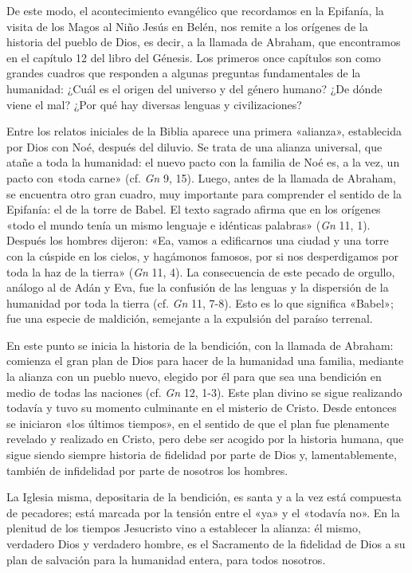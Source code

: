 \documentclass[]{article}
\begin{document}
De este modo, el acontecimiento evangélico que recordamos en la
Epifanía, la visita de los Magos al Niño Jesús en Belén, nos remite a
los orígenes de la historia del pueblo de Dios, es decir, a la llamada
de Abraham, que encontramos en el capítulo 12 del libro del Génesis. Los
primeros once capítulos son como grandes cuadros que responden a algunas
preguntas fundamentales de la humanidad: ¿Cuál es el origen del universo
y del género humano? ¿De dónde viene el mal? ¿Por qué hay diversas
lenguas y civilizaciones?

Entre los relatos iniciales de la Biblia aparece una primera «alianza»,
establecida por Dios con Noé, después del diluvio. Se trata de una
alianza universal, que atañe a toda la humanidad: el nuevo pacto con la
familia de Noé es, a la vez, un pacto con «toda carne» (cf. \emph{Gn} 9,
15). Luego, antes de la llamada de Abraham, se encuentra otro gran
cuadro, muy importante para comprender el sentido de la Epifanía: el de
la torre de Babel. El texto sagrado afirma que en los orígenes «todo el
mundo tenía un mismo lenguaje e idénticas palabras» (\emph{Gn} 11, 1).
Después los hombres dijeron: «Ea, vamos a edificarnos una ciudad y una
torre con la cúspide en los cielos, y hagámonos famosos, por si nos
desperdigamos por toda la haz de la tierra» (\emph{Gn} 11, 4). La
consecuencia de este pecado de orgullo, análogo al de Adán y Eva, fue la
confusión de las lenguas y la dispersión de la humanidad por toda la
tierra (cf. \emph{Gn} 11, 7-8). Esto es lo que significa «Babel»; fue
una especie de maldición, semejante a la expulsión del paraíso terrenal.

En este punto se inicia la historia de la bendición, con la llamada de
Abraham: comienza el gran plan de Dios para hacer de la humanidad una
familia, mediante la alianza con un pueblo nuevo, elegido por él para
que sea una bendición en medio de todas las naciones (cf. \emph{Gn} 12,
1-3). Este plan divino se sigue realizando todavía y tuvo su momento
culminante en el misterio de Cristo. Desde entonces se iniciaron «los
últimos tiempos», en el sentido de que el plan fue plenamente revelado y
realizado en Cristo, pero debe ser acogido por la historia humana, que
sigue siendo siempre historia de fidelidad por parte de Dios y,
lamentablemente, también de infidelidad por parte de nosotros los
hombres.

La Iglesia misma, depositaria de la bendición, es santa y a la vez está
compuesta de pecadores; está marcada por la tensión entre el «ya» y el
«todavía no». En la plenitud de los tiempos Jesucristo vino a establecer
la alianza: él mismo, verdadero Dios y verdadero hombre, es el
Sacramento de la fidelidad de Dios a su plan de salvación para la
humanidad entera, para todos nosotros.
\end{document}
